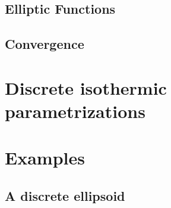 \documentclass{article}
\begin{document}
\subsection{Elliptic Functions}

\subsection{Convergence}

\section{Discrete isothermic parametrizations}

\section{Examples}
\subsection{A discrete ellipsoid}
\end{document}
